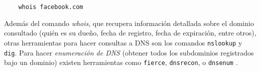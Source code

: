 \begin{lstlisting}
    whois facebook.com
\end{lstlisting}

Además del comando \emph{whois}, que recupera información detallada sobre el dominio consultado (quién es su dueño, fecha de registro, fecha de expiración, entre otros), otras herramientas para hacer consultas a DNS son los comandos \texttt{nslookup} y \texttt{dig}. Para hacer \emph{enumeración de DNS} (obtener todos los subdominios registrados bajo un dominio) existen herramientas como \texttt{fierce}, \texttt{dnsrecon}, o \texttt{dnsenum} \autocite{DNSEnumerationTools}.   







\clearpage
\printbibliography


